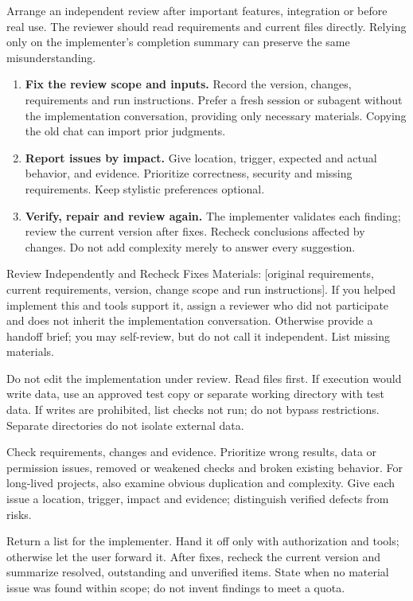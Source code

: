 Arrange an independent review after important features, integration or before real use. The reviewer should read requirements and current files directly. Relying only on the implementer's completion summary can preserve the same misunderstanding.
\begin{enumerate}
\item \textbf{Fix the review scope and inputs.} Record the version, changes, requirements and run instructions. Prefer a fresh session or subagent without the implementation conversation, providing only necessary materials. Copying the old chat can import prior judgments.
\item \textbf{Report issues by impact.} Give location, trigger, expected and actual behavior, and evidence. Prioritize correctness, security and missing requirements. Keep stylistic preferences optional.
\item \textbf{Verify, repair and review again.} The implementer validates each finding; review the current version after fixes. Recheck conclusions affected by changes. Do not add complexity merely to answer every suggestion.
\end{enumerate}
\begin{prompt}{Review Independently and Recheck Fixes}
Materials: [original requirements, current requirements, version, change scope and run instructions]. If you helped implement this and tools support it, assign a reviewer who did not participate and does not inherit the implementation conversation. Otherwise provide a handoff brief; you may self-review, but do not call it independent. List missing materials.\par
Do not edit the implementation under review. Read files first. If execution would write data, use an approved test copy or separate working directory with test data. If writes are prohibited, list checks not run; do not bypass restrictions. Separate directories do not isolate external data.\par
Check requirements, changes and evidence. Prioritize wrong results, data or permission issues, removed or weakened checks and broken existing behavior. For long-lived projects, also examine obvious duplication and complexity. Give each issue a location, trigger, impact and evidence; distinguish verified defects from risks.\par
Return a list for the implementer. Hand it off only with authorization and tools; otherwise let the user forward it. After fixes, recheck the current version and summarize resolved, outstanding and unverified items. State when no material issue was found within scope; do not invent findings to meet a quota.
\end{prompt}

